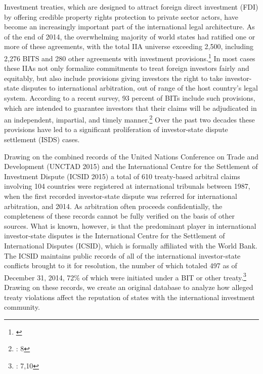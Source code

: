 \documentclass[12pt,onesided]{amsart}
\begin{document}

Investment treaties, which are designed to attract foreign direct investment (FDI) by offering credible property rights protection to private sector actors, have become an increasingly important part of the international legal architecture. As of the end of 2014, the overwhelming majority of world states had ratified one or more of these agreements, with the total IIA universe exceeding 2,500, including 2,276 BITS and 280 other agreements with investment provisions.\footnote{\citet{unctad:2015}} In most cases these IIAs not only formalize commitments to treat foreign investors fairly and equitably, but also include provisions giving investors the right to take investor-state disputes to international arbitration, out of range of the host country's legal system. According to a recent survey, 93 percent of BITs include such provisions, which are intended to guarantee investors that their claims will be adjudicated in an independent, impartial, and timely manner.\footnote{\citet{gaukordger:gordon:2012}: 8} Over the past two decades these provisions have led to a significant proliferation of investor-state dispute settlement (ISDS) cases.


Drawing on the combined records of the United Nations Conference on Trade and Development (UNCTAD 2015) and the International Centre for the Settlement of Investment Dispute (ICSID 2015) a total of 610 treaty-based arbitral claims involving 104 countries were registered at international tribunals between 1987, when the first recorded investor-state dispute was referred for international arbitration, and 2014. As arbitration often proceeds confidentially, the completeness of these records cannot be fully verified on the basis of other sources. What is known, however, is that the predominant player in international investor-state disputes is the International Centre for the Settlement of International Disputes (ICSID), which is formally affiliated with the World Bank. The ICSID maintains public records of all of the international investor-state conflicts brought to it for resolution, the number of which totaled 497 as of December 31, 2014, 72\% of which were initiated under a BIT or other treaty.\footnote{\citet{icsid:2015}: 7,10} Drawing on these records, we create an original database to analyze how alleged treaty violations affect the reputation of states with the international investment community. 
\end{document}
